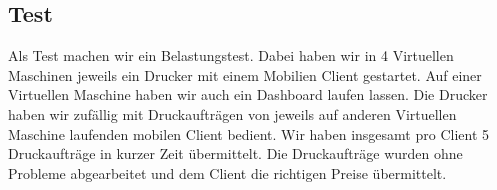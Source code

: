 \documentclass[10pt]{article}
\begin{document}
\subsection{Test}
Als Test machen wir ein Belastungstest. Dabei haben wir in 4 Virtuellen Maschinen jeweils ein Drucker mit einem Mobilien Client gestartet. Auf einer Virtuellen Maschine haben wir auch ein Dashboard laufen lassen. Die Drucker haben wir zufällig mit Druckaufträgen von jeweils auf anderen Virtuellen Maschine laufenden mobilen Client bedient. Wir haben insgesamt pro Client 5 Druckaufträge in kurzer Zeit übermittelt. Die Druckaufträge wurden ohne Probleme abgearbeitet und dem Client die richtigen Preise übermittelt.
\end{document}

